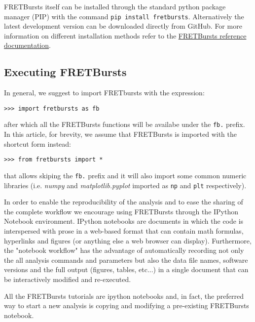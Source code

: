 FRETBursts itself can be installed through the standard python package manager (PIP)
with the command \texttt{pip install fretbursts}. 
Alternatively the latest development version can be downloaded directly 
from GitHub. For more information on different installation methods refer
to the 
\href{http://fretbursts.readthedocs.org/en/latest/installation.html}{FRETBursts reference documentation}.

\subsection{Executing FRETBursts}
\label{sec:import}
In general, we suggest to import FRETbursts with the expression:

\begin{verbatim}
>>> import fretbursts as fb
\end{verbatim}

after which all the FRETBursts functions will be availabe under the \verb|fb.|
prefix. In this article, for brevity, we assume that FRETBursts is imported 
with the shortcut form instead:

\begin{verbatim}
>>> from fretbursts import *
\end{verbatim}

that allows skiping the \verb|fb.| prefix and it will also import some common 
numeric libraries (i.e. \textit{numpy} and \textit{matplotlib.pyplot} 
imported as \verb|np| and \verb|plt| respectively).

In order to enable the reproducibility of the analysis and to ease
the sharing of the complete workflow we encourage using FRETBursts through 
the IPython Notebook environment. 
IPython notebooks are documents in which the code is interspersed with 
prose in a web-based format that can contain math formulas, hyperlinks 
and figures (or anything else a web browser can display).
Furthermore, the "notebook workflow"\cite{Shen_2014} has the advantage 
of automatically recording not only the all analysis commands and parameters 
but also the data file names, software versions and the full output 
(figures, tables, etc...) in a single document that can be interactively 
modified and re-executed.

All the FRETBursts tutorials are 
ipython notebooks and, in fact, the preferred way to start a new analysis is 
copying and modifying a pre-existing FRETBursts notebook.
